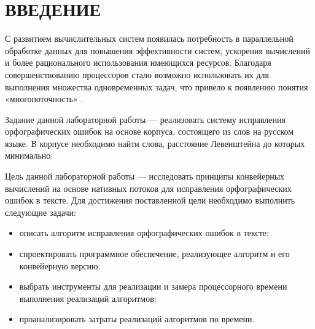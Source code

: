 \chapter*{ВВЕДЕНИЕ}

С развитием вычислительных систем появилась потребность в параллельной обработке данных для повышения эффективности систем, ускорения вычислений и более рационального использования имеющихся ресурсов. 
Благодаря совершенствованию процессоров стало возможно использовать их для выполнения множества одновременных задач, что привело к появлению понятия «многопоточность» \cite{intro}.

Задание данной лабораторной работы --- реализовать систему исправления орфографических ошибок на основе корпуса, состоящего из слов на русском языке.
В корпусе необходимо найти слова, расстояние Левенштейна до которых минимально.

Цель данной лабораторной работы --- исследовать принципы конвейерных вычислений на основе нативных потоков для исправления орфографических ошибок в тексте. 
Для достижения поставленной цели необходимо выполнить следующие задачи:
\begin{itemize}
	\item описать алгоритм исправления орфографических ошибок в тексте;
	\item спроектировать программное обеспечение, реализующее алгоритм и его конвейерную версию;
	\item выбрать инструменты для реализации и замера процессорного времени
	выполнения реализаций алгоритмов;
	\item проанализировать затраты реализаций алгоритмов по времени.
\end{itemize}